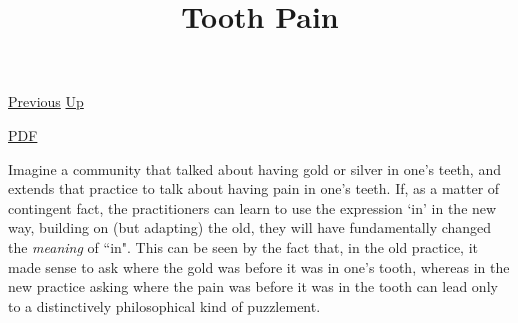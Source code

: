 \documentclass[12pt,a4paper]{report}
\begin{document}
 \href{doc/phil/PhilSituations/MontaigneDog.html}{Previous} 
 \href{doc/phil/PhilSituations.html}{Up} 

 \href{doc/phil/PhilSituations/ToothPain.pdf}{PDF} 
\title{Tooth Pain}
Imagine a community that talked about having gold or silver in one’s teeth,
and extends that practice to talk about having pain in one’s teeth. If, as a
matter of contingent fact, the practitioners can learn to use the expression
‘in’ in the new way, building on (but adapting) the old, they will have
fundamentally changed the \emph{meaning} of ``in". This can be seen by the
fact that, in the old practice, it made sense to ask where the gold was before
it was in one’s tooth, whereas in the new practice asking where the pain was
before it was in the tooth can lead only to a distinctively philosophical kind
of puzzlement.

\cite{brandom2019some}



\end{document}
